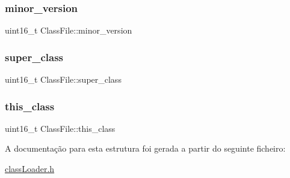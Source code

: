\hypertarget{struct_class_file_a357116b538d1b1ef11073560eba9396d}{}\label{struct_class_file_a357116b538d1b1ef11073560eba9396d} 
\subsubsection{\texorpdfstring{minor\+\_\+version}{minor\_version}}
{\footnotesize\ttfamily uint16\+\_\+t Class\+File\+::minor\+\_\+version}

\hypertarget{struct_class_file_aa48f683b6e5b60021410f88a5e831cbe}{}\label{struct_class_file_aa48f683b6e5b60021410f88a5e831cbe} 
\subsubsection{\texorpdfstring{super\+\_\+class}{super\_class}}
{\footnotesize\ttfamily uint16\+\_\+t Class\+File\+::super\+\_\+class}

\hypertarget{struct_class_file_aa45abc9545fe11fca252d9769b665294}{}\label{struct_class_file_aa45abc9545fe11fca252d9769b665294} 
\subsubsection{\texorpdfstring{this\+\_\+class}{this\_class}}
{\footnotesize\ttfamily uint16\+\_\+t Class\+File\+::this\+\_\+class}



A documentação para esta estrutura foi gerada a partir do seguinte ficheiro\+:\begin{DoxyCompactItemize}
\item 
\hyperlink{class_loader_8h}{class\+Loader.\+h}\end{DoxyCompactItemize}
